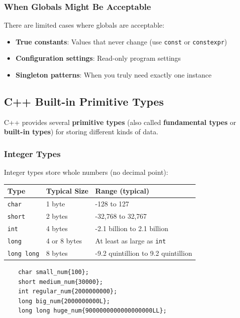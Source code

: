 \subsubsection{When Globals Might Be Acceptable}

There are limited cases where globals are acceptable:
\begin{itemize}
	\item \textbf{True constants}: Values that never change (use \texttt{const} or \texttt{constexpr})
	\item \textbf{Configuration settings}: Read-only program settings
	\item \textbf{Singleton patterns}: When you truly need exactly one instance
\end{itemize}

\subsection{C++ Built-in Primitive Types}

C++ provides several \textbf{primitive types} (also called \textbf{fundamental types} or \textbf{built-in types}) for storing different kinds of data.

\subsubsection{Integer Types}

Integer types store whole numbers (no decimal point):

\begin{center}
	\begin{tabular}{|l|l|l|}
		\hline
		\textbf{Type} & \textbf{Typical Size} & \textbf{Range (typical)} \\
		\hline
		\texttt{char} & 1 byte & -128 to 127 \\
		\texttt{short} & 2 bytes & -32,768 to 32,767 \\
		\texttt{int} & 4 bytes & -2.1 billion to 2.1 billion \\
		\texttt{long} & 4 or 8 bytes & At least as large as \texttt{int} \\
		\texttt{long long} & 8 bytes & -9.2 quintillion to 9.2 quintillion \\
		\hline
	\end{tabular}
\end{center}

\begin{lstlisting}
	char small_num{100};
	short medium_num{30000};
	int regular_num{2000000000};
	long big_num{2000000000L};
	long long huge_num{9000000000000000000LL};
\end{lstlisting}

